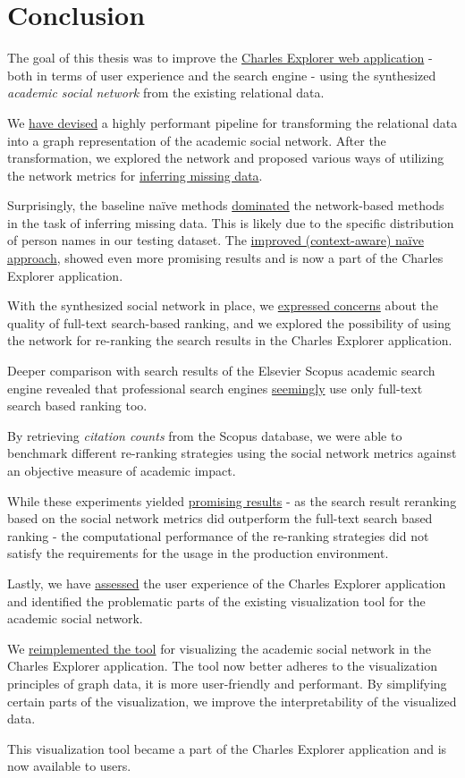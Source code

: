 \chapter*{Conclusion}

The goal of this thesis was to improve the \href{https://explorer.cuni.cz/}{Charles Explorer web application} - both in terms of user experience and the search engine - using the synthesized \textit{academic social network} from the existing relational data.

We \hyperref[sec:target-data-model]{have devised} a highly performant pipeline for transforming the relational data into a graph representation of the academic social network.
After the transformation, we explored the network and proposed various ways of utilizing the network metrics for \hyperref[sec:inferring-missing-identities]{inferring missing data}.

Surprisingly, the baseline naïve methods \hyperref[fig:hierarchical-f1]{dominated} the network-based methods in the task of inferring missing data.
This is likely due to the specific distribution of person names in our testing dataset.
The \hyperref[sec:on-demand-identity-inference]{improved (context-aware) naïve approach}, showed even more promising results and is now a part of the Charles Explorer application.

With the synthesized social network in place, 
we \hyperref[search-ranking-issues]{expressed concerns} about the quality of full-text search-based ranking, and we explored the possibility of using the network for re-ranking the search results in the Charles Explorer application.

Deeper comparison with search results of the Elsevier Scopus academic search engine revealed that
professional search engines \hyperref[baseline-benchmark]{seemingly} use only full-text search based ranking too.

By retrieving \textit{citation counts} from the Scopus database, we were able to benchmark different re-ranking strategies using the social network metrics against
an objective measure of academic impact.

While these experiments yielded \hyperref[citation-based-ranking]{promising results} - as the search result reranking based on the social network metrics 
did outperform the full-text search based ranking - the computational performance of the re-ranking strategies did not satisfy the requirements for the usage in the production environment.

Lastly, we have \hyperref[sec:current-state]{assessed} the user experience of the Charles Explorer application 
and identified the problematic parts of the existing visualization tool for the academic social network.

We \hyperref[sec:addressing-issues]{reimplemented the tool} for visualizing the academic social network in the Charles Explorer application. 
The tool now better adheres to the visualization principles of graph data, it is more user-friendly and performant.
By simplifying certain parts of the visualization, we improve the interpretability of the visualized data.

This visualization tool became a part of the Charles Explorer application and is now available to users.

